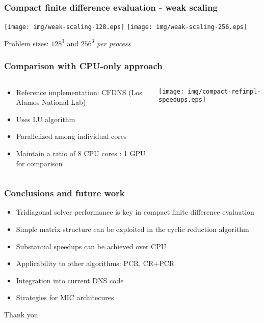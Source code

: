 \begin{frame}
\frametitle{Compact finite difference evaluation - weak scaling}
\centering
\texttt{[image: img/weak-scaling-128.eps]}
\texttt{[image: img/weak-scaling-256.eps]}

Problem sizes: $128^3$ and $256^3$ \emph{per process}
\end{frame}

\begin{frame}
\frametitle{Comparison with CPU-only approach}
\begin{columns}
\begin{column}{0.5\textwidth}
\begin{itemize}
\item Reference implementation: CFDNS
    (Los Alamos National Lab)
\item Uses LU algorithm
\item Parallelized among individual cores
\item Maintain a ratio of 8 CPU cores : 1 GPU for comparison
\end{itemize}
\end{column}
\begin{column}{0.5\textwidth}
\centering
\begin{table}
\resizebox{0.75\textwidth}{!}{%

}
\end{table}

\texttt{[image: img/compact-refimpl-speedups.eps]}
\end{column}
\end{columns}
\end{frame}

\begin{frame}
\frametitle{Conclusions and future work}
\begin{itemize}
    \item Tridiagonal solver performance
        is key in compact finite difference evaluation
    \item Simple matrix structure can be exploited
        in the cyclic reduction algorithm
    \item Substantial speedups can be achieved
        over CPU
    \item Applicability to other algorithms: PCR, CR+PCR
    \item Integration into current DNS code
    \item Strategies for MIC architecures
\end{itemize}
\end{frame}

\begin{frame}
    Thank you    
\end{frame}

